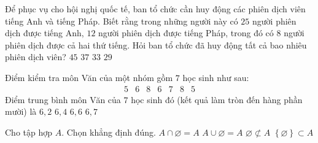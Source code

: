 \begin{ex}%
	Để phục vụ cho hội nghị  quốc tế, ban tổ chức cần huy động các phiên dịch viên tiếng Anh và
	tiếng Pháp. Biết rằng trong những  người này có $25$ người phiên dịch được tiếng Anh, $12$ người phiên dịch
	được  tiếng Pháp, trong đó có $8$ người phiên dịch được cả hai thứ tiếng. Hỏi ban tổ chức đã huy động tất
	cả bao  nhiêu phiên dịch viên?
	 \choice
		{$45$} 
		{$37$} 
		{$33$} 
		{\True  $29$}
\end{ex}

\begin{ex}%
	Điểm kiểm tra môn  Văn của một nhóm gồm $7$ học sinh như sau:
	$$ 
	\begin{array}{llllllll}
		5 & 6 & 8 & 6 & 7  & 8 & 5
	\end{array}
	$$ 
	Điểm trung bình môn Văn của $7$ học sinh đó (kết quả làm  tròn đến hàng phần mười) là
	 \choice
		{$6{,}2$} 
		{\True  $6{,}4$}
		 {$6{,}6$}
		 {$6{,}7$}
\end{ex}

\begin{ex}%
	 Cho tập hợp $ A $. Chọn khẳng định đúng.
	 \choice
		{$ A\cap \varnothing  = A $}
		{\True $  A \cup \varnothing = A $}
		 {$\varnothing\not\subset A$}
		{$\left\lbrace \varnothing\right\rbrace\subset A$} 
\end{ex}

